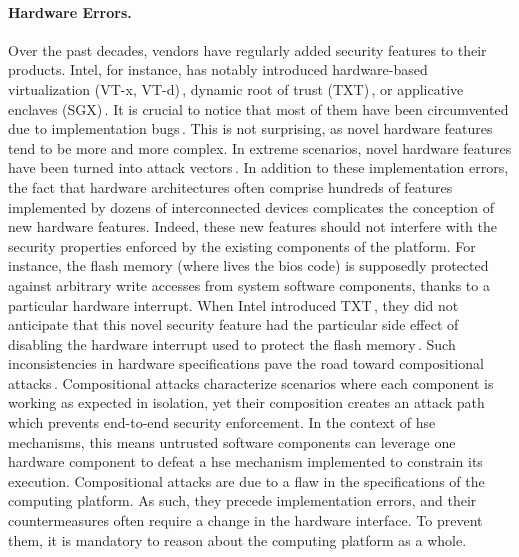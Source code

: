 \paragraph{Hardware Errors.}
%
Over the past decades, vendors have regularly added security features to their
products.
%
Intel, for instance, has notably introduced hardware-based virtualization (VT-x,
VT-d)\,\cite{intel2014manualvt}, dynamic root of trust
(TXT)\,\cite{intel2015txt}, or applicative enclaves
(SGX)\,\cite{intel2014manualsgx,costan2016sgxexplained}.
%
It is crucial to notice that most of them have been circumvented due to
implementation bugs\,\cite{wojtczuk2011txtbug,sang2010iommu}.
%
This is not surprising, as novel hardware features tend to be more and more
complex.
%
In extreme scenarios, novel hardware features have been turned into attack
vectors\,\cite{wojtczuk2011txtbug}.
%
In addition to these implementation errors, the fact that hardware architectures
often comprise hundreds of features implemented by dozens of interconnected
devices complicates the conception of new hardware features.
%
Indeed, these new features should not interfere with the security properties
enforced by the existing components of the platform.
%
For instance, the flash memory (where lives the \ac{bios} code) is supposedly
protected against arbitrary write accesses from system software components,
thanks to a particular hardware interrupt.
%
When Intel introduced TXT\,\cite{intel2015txt}, they did not anticipate that
this novel security feature had the particular side effect of disabling the
hardware interrupt used to protect the flash memory\,\cite{kovah2015senter}.
%
Such inconsistencies in hardware specifications pave the road toward
compositional attacks\,\cite{wing2003compositionalattack}.
%
Compositional attacks characterize scenarios where each component is working as
expected in isolation, yet their composition creates an attack path which
prevents end-to-end security enforcement.
%
In the context of \ac{hse} mechanisms, this means untrusted software components
can leverage one hardware component to defeat a \ac{hse} mechanism implemented
to constrain its execution.
%
%
Compositional attacks are due to a flaw in the specifications of the computing
platform.
%
As such, they precede implementation errors, and their countermeasures often
require a change in the hardware interface.
%
To prevent them, it is mandatory to reason about the computing platform as a
whole.

